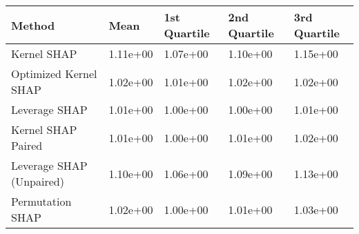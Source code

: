 \begin{tabular}{lllll}
  \toprule
  \textbf{Method} & \textbf{Mean} & \textbf{1st Quartile} & \textbf{2nd Quartile} & \textbf{3rd Quartile} \\ \midrule 
Kernel SHAP & 1.11e+00 & 1.07e+00 & 1.10e+00 & 1.15e+00\\
Optimized Kernel SHAP & \cellcolor{bronze!60}1.02e+00 & 1.01e+00 & 1.02e+00 & \cellcolor{silver!60}1.02e+00\\
Leverage SHAP & \cellcolor{gold!60}1.01e+00 & \cellcolor{gold!60}1.00e+00 & \cellcolor{gold!60}1.00e+00 & \cellcolor{gold!60}1.01e+00\\
Kernel SHAP Paired & \cellcolor{gold!60}1.01e+00 & \cellcolor{gold!60}1.00e+00 & \cellcolor{silver!60}1.01e+00 & \cellcolor{silver!60}1.02e+00\\
Leverage SHAP (Unpaired) & 1.10e+00 & 1.06e+00 & 1.09e+00 & 1.13e+00\\
Permutation SHAP & \cellcolor{bronze!60}1.02e+00 & \cellcolor{gold!60}1.00e+00 & \cellcolor{silver!60}1.01e+00 & 1.03e+00\\
\bottomrule
\end{tabular}